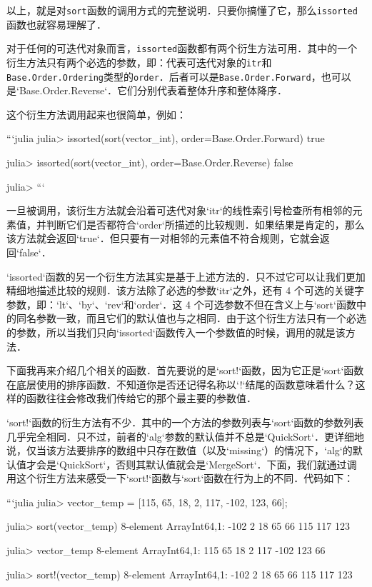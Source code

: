 以上，就是对\verb|sort|函数的调用方式的完整说明．只要你搞懂了它，那么\verb|issorted|函数也就容易理解了．

对于任何的可迭代对象而言，\verb|issorted|函数都有两个衍生方法可用．其中的一个衍生方法只有两个必选的参数，即：代表可迭代对象的\verb|itr|和\verb|Base.Order.Ordering|类型的\verb|order|．后者可以是\verb|Base.Order.Forward|，也可以是`Base.Order.Reverse`．它们分别代表着整体升序和整体降序．

这个衍生方法调用起来也很简单，例如：

```julia
julia> issorted(sort(vector_int), order=Base.Order.Forward)
true

julia> issorted(sort(vector_int), order=Base.Order.Reverse)
false

julia> 
```

一旦被调用，该衍生方法就会沿着可迭代对象`itr`的线性索引号检查所有相邻的元素值，并判断它们是否都符合`order`所描述的比较规则．如果结果是肯定的，那么该方法就会返回`true`．但只要有一对相邻的元素值不符合规则，它就会返回`false`．

`issorted`函数的另一个衍生方法其实是基于上述方法的．只不过它可以让我们更加精细地描述比较的规则．该方法除了必选的参数`itr`之外，还有 4 个可选的关键字参数，即：`lt`、`by`、`rev`和`order`．这 4 个可选参数不但在含义上与`sort`函数中的同名参数一致，而且它们的默认值也与之相同．由于这个衍生方法只有一个必选的参数，所以当我们只向`issorted`函数传入一个参数值的时候，调用的就是该方法．

下面我再来介绍几个相关的函数．首先要说的是`sort!`函数，因为它正是`sort`函数在底层使用的排序函数．不知道你是否还记得名称以`!`结尾的函数意味着什么？这样的函数往往会修改我们传给它的那个最主要的参数值．

`sort!`函数的衍生方法有不少．其中的一个方法的参数列表与`sort`函数的参数列表几乎完全相同．只不过，前者的`alg`参数的默认值并不总是`QuickSort`．更详细地说，仅当该方法要排序的数组中只存在数值（以及`missing`）的情况下，`alg`的默认值才会是`QuickSort`，否则其默认值就会是`MergeSort`．下面，我们就通过调用这个衍生方法来感受一下`sort!`函数与`sort`函数在行为上的不同．代码如下：

```julia
julia> vector_temp = [115, 65, 18, 2, 117, -102, 123, 66];

julia> sort(vector_temp)
8-element Array{Int64,1}:
 -102
    2
   18
   65
   66
  115
  117
  123

julia> vector_temp
8-element Array{Int64,1}:
  115
   65
   18
    2
  117
 -102
  123
   66

julia> sort!(vector_temp)
8-element Array{Int64,1}:
 -102
    2
   18
   65
   66
  115
  117
  123


